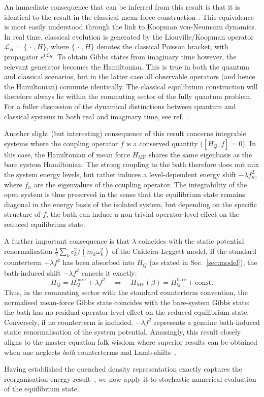 An immediate consequence that can be inferred from this result is that it is identical to the result in the classical mean-force construction
\cite{campisiTalknerHanggi2009Solvable,talknerColloquiumStatisticalMechanics2020,cerisolaQuantumClassicalCorrespondence2024}. This equivalence is most easily understood through the link to Koopman von-Neumann dynamics. In real time, classical evolution is generated by the Liouville/Koopman operator $\mathcal L_H=\{\,\cdot\,,H\}$, where $\{\,\cdot\,,H\}$ denotes the classical Poisson bracket, with propagator $e^{t\mathcal L_H}$. To obtain Gibbs states from imaginary time however, the relevant generator becomes the Hamiltonian. This is true in both the quantum and classical scenarios, but in the latter case all observable operators (and hence the Hamiltonian) commute identically. The classical equilibrium construction will therefore always lie within the commuting sector of the fully quantum problem. For a fuller discussion of the dynamical distinctions between quantum and classical systems in both real and imaginary time, see ref.~\cite{McCaulZhdanovBondar2023WaveOperator}.

Another slight (but interesting) consequence of this result concerns integrable systems where the coupling operator $f$ is a conserved quantity ($[H_Q, f]=0$). In this case, the Hamiltonian of mean force $H_{\mathrm{MF}}$ shares the same eigenbasis as the bare system Hamiltonian. The strong coupling to the bath therefore does not mix the system energy levels, but rather induces a level-dependent energy shift $-\lambda f_n^2$, where $f_n$ are the eigenvalues of the coupling operator. The integrability of the open system is thus preserved in the sense that the equilibrium state remains diagonal in the energy basis of the isolated system, but depending on the specific structure of $f$, the bath can induce a non-trivial operator-level effect on the reduced equilibrium state. 

A further important consequence is that $\lambda$ coincides with the static potential renormalisation $\frac{1}{2}\sum_k c_k^2/(m_k\omega_k^2)$ of the Caldeira-Leggett model. If the standard counterterm $+\lambda f^2$ has been absorbed into $H_Q$ (as stated in Sec.~\ref{sec:model}), the bath-induced shift $-\lambda f^2$ cancels it exactly:
\begin{equation}
    H_Q = H_Q^{\mathrm{bare}}+\lambda f^2
    \quad\Longrightarrow\quad
    H_{\mathrm{MF}}(\beta)=H_Q^{\mathrm{bare}}+\mathrm{const}.
    \label{eq:counterterm_cancellation}
\end{equation}
Thus, in the commuting sector with the standard counterterm convention, the normalised mean-force Gibbs state coincides with the bare-system Gibbs state: the bath has no residual operator-level effect on the reduced equilibrium state. Conversely, if no counterterm is included, $-\lambda f^2$ represents a genuine bath-induced static renormalisation of the system potential. Amusingly, this result closely aligns to the master equation folk wisdom where superior results can be obtained when one neglects \emph{both} counterterms and Lamb-shifts~\cite{correaPotentialRenormalisationLamb2025}.

Having established the quenched density representation exactly captures the reorganisation-energy result~\cite{campisiTalknerHanggi2009Solvable}, we now apply it to stochastic numerical evaluation of the equilibrium state.


